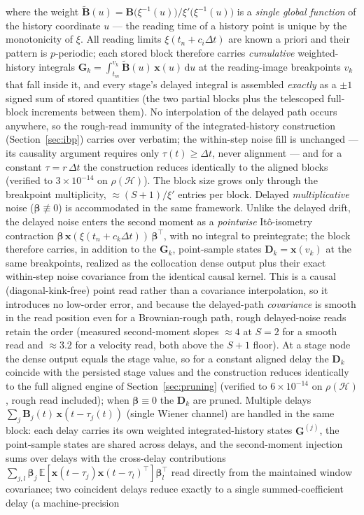 \documentclass[preprint,12pt]{elsarticle}
\begin{document}
where the weight $\widetilde{\mathbf{B}}(u) = \mathbf{B}\big(\xi^{-1}(u)\big)/\xi'\big(\xi^{-1}(u)\big)$ is a \emph{single global function} of the history coordinate $u$ --- the reading time of a history point is unique by the monotonicity of $\xi$. All reading limits $\xi(t_n + c_i \Delta t)$ are known a priori and their pattern is $p$-periodic; each stored block therefore carries \emph{cumulative} weighted-history integrals $\mathbf{G}_k = \int_{t_m}^{v_k} \widetilde{\mathbf{B}}(u)\,\mathbf{x}(u)\,\mathrm{d}u$ at the reading-image breakpoints $v_k$ that fall inside it, and every stage's delayed integral is assembled \emph{exactly} as a $\pm 1$ signed sum of stored quantities (the two partial blocks plus the telescoped full-block increments between them). No interpolation of the delayed path occurs anywhere, so the rough-read immunity of the integrated-history construction (Section~\ref{sec:ibp}) carries over verbatim; the within-step noise fill is unchanged --- its causality argument requires only $\tau(t) \ge \Delta t$, never alignment --- and for a constant $\tau = r\,\Delta t$ the construction reduces identically to the aligned blocks (verified to $3\times 10^{-14}$ on $\rho(\mathcal{H})$). The block size grows only through the breakpoint multiplicity, $\approx (S{+}1)/\xi'$ entries per block. Delayed \emph{multiplicative} noise ($\boldsymbol\beta \not\equiv 0$) is accommodated in the same framework. Unlike the delayed drift, the delayed noise enters the second moment as a \emph{pointwise} It\^o-isometry contraction $\boldsymbol\beta\,\mathbf{x}(\xi(t_{n}{+}c_k\Delta t))\,\boldsymbol\beta^\top$, with no integral to preintegrate; the block therefore carries, in addition to the $\mathbf{G}_k$, point-sample states $\mathbf{D}_k = \mathbf{x}(v_k)$ at the same breakpoints, realized as the collocation dense output plus their exact within-step noise covariance from the identical causal kernel. This is a causal (diagonal-kink-free) point read rather than a covariance interpolation, so it introduces no low-order error, and because the delayed-path \emph{covariance} is smooth in the read position even for a Brownian-rough path, rough delayed-noise reads retain the order (measured second-moment slopes $\approx 4$ at $S{=}2$ for a smooth read and $\approx 3.2$ for a velocity read, both above the $S{+}1$ floor). At a stage node the dense output equals the stage value, so for a constant aligned delay the $\mathbf{D}_k$ coincide with the persisted stage values and the construction reduces identically to the full aligned engine of Section~\ref{sec:pruning} (verified to $6\times10^{-14}$ on $\rho(\mathcal{H})$, rough read included); when $\boldsymbol\beta\equiv0$ the $\mathbf{D}_k$ are pruned. Multiple delays $\sum_j \mathbf{B}_j(t)\,\mathbf{x}(t-\tau_j(t))$ (single Wiener channel) are handled in the same block: each delay carries its own weighted integrated-history states $\mathbf{G}^{(j)}$, the point-sample states are shared across delays, and the second-moment injection sums over delays with the cross-delay contributions $\sum_{j,l}\boldsymbol\beta_j\,\mathbb{E}[\mathbf{x}(t{-}\tau_j)\mathbf{x}(t{-}\tau_l)^\top]\boldsymbol\beta_l^\top$ read directly from the maintained window covariance; two coincident delays reduce exactly to a single summed-coefficient delay (a machine-precision 
\end{document}
